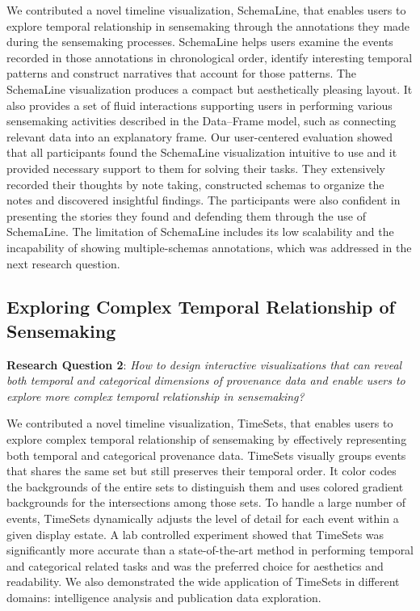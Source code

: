 We contributed a novel timeline visualization, SchemaLine, that enables users to explore temporal relationship in sensemaking through the annotations they made during the sensemaking processes. SchemaLine helps users examine the events recorded in those annotations in chronological order, identify interesting temporal patterns and construct narratives that account for those patterns. The SchemaLine visualization produces a compact but aesthetically pleasing layout. It also provides a set of fluid interactions supporting users in performing various sensemaking activities described in the Data--Frame model, such as connecting relevant data into an explanatory frame. Our user-centered evaluation showed that all participants found the SchemaLine visualization intuitive to use and it provided necessary support to them for solving their tasks. They extensively recorded their thoughts by note taking, constructed schemas to organize the notes and discovered insightful findings. The participants were also confident in presenting the stories they found and defending them through the use of SchemaLine. The limitation of SchemaLine includes its low scalability and the incapability of showing multiple-schemas annotations, which was addressed in the next research question.
	
\subsection{Exploring Complex Temporal Relationship of Sensemaking}
\textbf{Research Question 2}: \emph{How to design interactive visualizations that can reveal both temporal and categorical dimensions of provenance data and enable users to explore more complex temporal relationship in sensemaking?}

We contributed a novel timeline visualization, TimeSets, that enables users to explore complex temporal relationship of sensemaking by effectively representing both temporal and categorical provenance data. TimeSets visually groups events that shares the same set but still preserves their temporal order. It color codes the backgrounds of the entire sets to distinguish them and uses colored gradient backgrounds for the intersections among those sets. To handle a large number of events, TimeSets dynamically adjusts the level of detail for each event within a given display estate. A lab controlled experiment showed that TimeSets was significantly more accurate than a state-of-the-art method in performing temporal and categorical related tasks and was the preferred choice for aesthetics and readability. We also demonstrated the wide application of TimeSets in different domains: intelligence analysis and publication data exploration.

